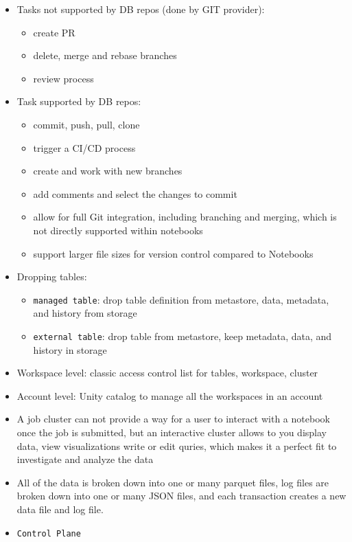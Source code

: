 \documentclass[11pt]{scrartcl}
\begin{document}
\begin{itemize}
	\item Tasks not supported by DB repos (done by GIT provider):
	\begin{itemize}
		\item create PR
		\item delete, merge and rebase branches
		\item review process
	\end{itemize}
	\item Task supported by DB repos:
	\begin{itemize}
		\item commit, push, pull, clone
		\item trigger a CI/CD process
		\item create and work with new branches
		\item add comments and select the changes to commit
		\item allow for full Git integration, including branching and merging, which is not directly supported within notebooks
		\item support larger file sizes for version control compared to Notebooks
	\end{itemize}
	\item Dropping tables:
	\begin{itemize}
		\item \texttt{managed table}: drop table definition from metastore, data, metadata, and history from storage
		\item \texttt{external table}: drop table from metastore, keep metadata, data, and history in storage
	\end{itemize}
	\item Workspace level: classic access control list for tables, workspace, cluster
	\item Account level: Unity catalog to manage all the workspaces in an account 
	\item A job cluster can not provide a way for a user to interact with a notebook once the job is submitted, but an interactive cluster allows to you display data, view visualizations write or edit quries, which makes it a perfect fit to investigate and analyze the data
	\item All of the data is broken down into one or many parquet files, log files are broken down into one or many JSON files, and each transaction creates a new data file and log file.
	\item \texttt{Control Plane}
	\begin{itemize}

\end{itemize}
\end{itemize}
\end{document}
